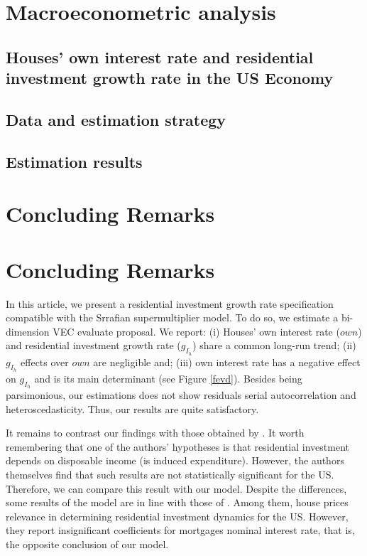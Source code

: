 \documentclass[11pt]{article}
\begin{document}
\section{Macroeconometric analysis}
\label{sec:org1d3ae18}

\subsection{Houses’ own interest rate and residential investment growth rate in the US Economy}
\label{sec:org740ee4c}

\subsection{Data and estimation strategy}
\label{sec:org45cf168}

\subsection{Estimation results}
\label{sec:org9ea3507}



\section{Concluding Remarks}
\label{sec:org82b1225}
\label{sec:Conclusion}
\section{Concluding Remarks}\label{sec:Conclusion}

In this article, we present a residential investment growth rate specification compatible with the Srrafian supermultiplier model.
To do so, we estimate a bi-dimension VEC evaluate \textcite{teixeira_crescimento_2015}
proposal. 
We report: 
	(i) Houses' own interest rate (\(own\)) and residential investment growth rate (\(g_{I_h}\)) share a common long-run trend;
	(ii) \(g_{I_h}\) effects over \(own\) are negligible and; 
	(iii) own interest rate has a negative effect on \(g_{I_h}\) and is its main determinant (see Figure \ref{fevd}).
Besides being parsimonious, our estimations does not show residuals serial autocorrelation and heteroscedasticity. Thus, our results are quite satisfactory.

It remains to contrast our findings with those obtained by \textcite{arestis_residential_2015}.
It worth remembering that one of the authors' hypotheses is that residential investment depends on disposable income (is induced expenditure).
However, the authors themselves find that such results are not statistically significant for the US. Therefore, we can compare this result with our model.
Despite the differences, some results of the model are in line with those of \textcite{arestis_residential_2015}.
Among them, house prices relevance in determining residential investment dynamics for the US.
However, they report insignificant coefficients for mortgages nominal interest rate, that is, the opposite conclusion of our model.
\end{document}

